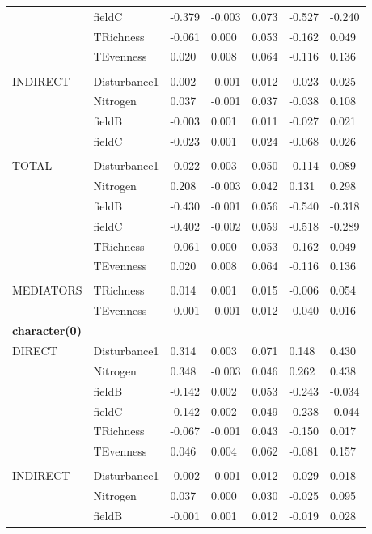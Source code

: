 \begin{longtable}[c]{l l l l l l l }
 & fieldC & -0.379 & -0.003 & 0.073 & -0.527 & -0.240\\
 & TRichness & -0.061 & 0.000 & 0.053 & -0.162 & 0.049\\
 & TEvenness & 0.020 & 0.008 & 0.064 & -0.116 & 0.136\\
 & & & & & & \\
 INDIRECT & Disturbance1 & 0.002 & -0.001 & 0.012 & -0.023 & 0.025\\
 & Nitrogen & 0.037 & -0.001 & 0.037 & -0.038 & 0.108\\
 & fieldB & -0.003 & 0.001 & 0.011 & -0.027 & 0.021\\
 & fieldC & -0.023 & 0.001 & 0.024 & -0.068 & 0.026\\
 & & & & & & \\
 TOTAL & Disturbance1 & -0.022 & 0.003 & 0.050 & -0.114 & 0.089\\
 & Nitrogen & 0.208 & -0.003 & 0.042 & 0.131 & 0.298\\
 & fieldB & -0.430 & -0.001 & 0.056 & -0.540 & -0.318\\
 & fieldC & -0.402 & -0.002 & 0.059 & -0.518 & -0.289\\
 & TRichness & -0.061 & 0.000 & 0.053 & -0.162 & 0.049\\
 & TEvenness & 0.020 & 0.008 & 0.064 & -0.116 & 0.136\\
 & & & & & & \\
 MEDIATORS &TRichness & 0.014 & 0.001 & 0.015 & -0.006 & 0.054\\
 & TEvenness & -0.001 & -0.001 & 0.012 & -0.040 & 0.016\\
\textbf{character(0)} &  &  &  &  &  &\\
\hline
 DIRECT & Disturbance1 & 0.314 & 0.003 & 0.071 & 0.148 & 0.430\\
 & Nitrogen & 0.348 & -0.003 & 0.046 & 0.262 & 0.438\\
 & fieldB & -0.142 & 0.002 & 0.053 & -0.243 & -0.034\\
 & fieldC & -0.142 & 0.002 & 0.049 & -0.238 & -0.044\\
 & TRichness & -0.067 & -0.001 & 0.043 & -0.150 & 0.017\\
 & TEvenness & 0.046 & 0.004 & 0.062 & -0.081 & 0.157\\
 & & & & & & \\
 INDIRECT & Disturbance1 & -0.002 & -0.001 & 0.012 & -0.029 & 0.018\\
 & Nitrogen & 0.037 & 0.000 & 0.030 & -0.025 & 0.095\\
 & fieldB & -0.001 & 0.001 & 0.012 & -0.019 & 0.028\\

\end{longtable}
